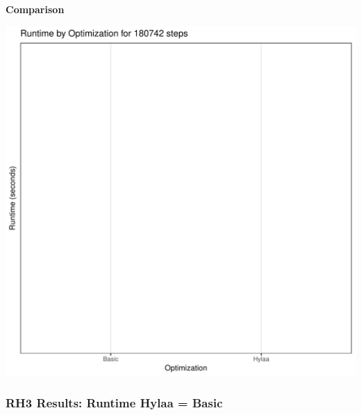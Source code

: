\documentclass{article}\usepackage[]{graphicx}\usepackage[]{color}
\makeatletter
\def\maxwidth{ %
  \ifdim\Gin@nat@width>\linewidth
    \linewidth
  \else
    \Gin@nat@width
  \fi
}
\newenvironment{knitrout}{}{} %
\makeatother
\begin{document}
 \textbf{Comparison}
  
\begin{knitrout}
\color{fgcolor}
\includegraphics[width=\maxwidth]{figure/RH3_steps180742-1} 

\end{knitrout}


 

	
	\subsubsection{RH3 Results: Runtime Hylaa = Basic}
	
\end{document}

